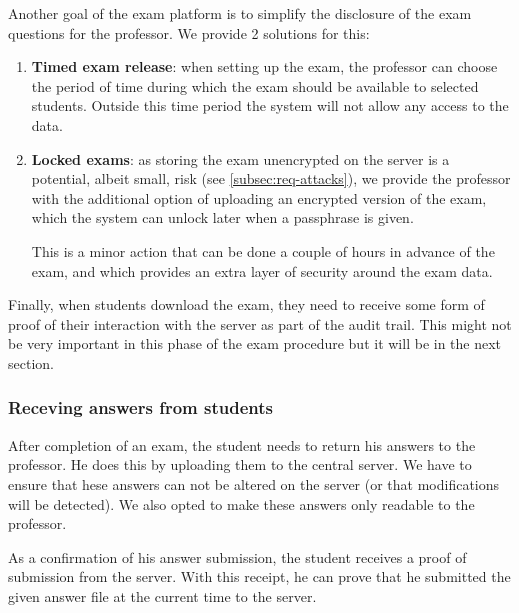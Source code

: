 \documentclass[12pt]{article}
\begin{document}
Another goal of the exam platform is to simplify the disclosure of the exam
questions for the professor. We provide 2 solutions for this:

\begin{enumerate}

\item \textbf{Timed exam release}: when setting up the exam, the professor can
choose the period of time during which the exam should be available to selected
students. Outside this time period the system will not allow any access to the
data.

\item \textbf{Locked exams}: as storing the exam unencrypted on the server is a
potential, albeit small, risk (see \autoref{subsec:req-attacks}), we provide the
professor with the additional option of uploading an encrypted version of the
exam, which the system can unlock later when a passphrase is given.

This is a minor action that can be done a couple of hours in advance of the
exam, and which provides an extra layer of security around the exam data.

\end{enumerate}

Finally, when students download the exam, they need to receive some form of
proof of their interaction with the server as part of the audit trail. This
might not be very important in this phase of the exam procedure but it will be
in the next section.

\subsubsection{Receving answers from students}
\label{subsubsec:req-func-answers}


After completion of an exam, the student needs to return his answers to the
professor. He does this by uploading them to the central server. We have to
ensure that hese answers can not be altered on the server (or that modifications
will be detected). We also opted to make these answers only readable to the
professor.

As a confirmation of his answer submission, the student receives a proof of
submission from the server. With this receipt, he can prove that he submitted
the given answer file at the current time to the server.
\end{document}
